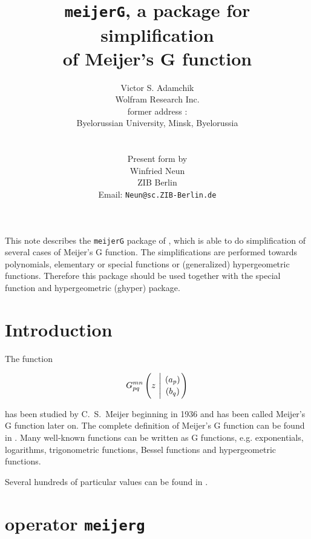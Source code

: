 \title{{\tt meijerG}, a package for simplification\\
of Meijer's G function}
\date{}
\author{Victor S. Adamchik\\
	Wolfram Research Inc. \\
	former address : \\
	Byelorussian University, Minsk, Byelorussia\\
\\
\\
	Present \REDUCE{} form by \\
	Winfried Neun \\
	ZIB Berlin \\
        Email: {\tt Neun@sc.ZIB-Berlin.de}}

\maketitle

This note describes the {\tt meijerG} package of \REDUCE{}, which is able
to do simplification of several cases of Meijer's G function. 
The simplifications are performed towards polynomials, elementary or
special functions or (generalized) hypergeometric functions.
Therefore this package should be used together with the \REDUCE{}
special function and hypergeometric (ghyper) package.

\section{Introduction}

The function 

\begin{displaymath}
G_{p q}^{m n} \left( z \  \Bigg\vert \  {(a_p) \atop (b_q)} \right)
\end{displaymath}

has been studied by C.~S.~Meijer beginning in 1936 and has been
called Meijer's G function later on. The complete definition of Meijer's
G function can be found in \cite{Prudnikov:90}.
Many well-known functions can be written as G functions,
e.g. exponentials, logarithms, trigonometric functions, Bessel functions
and hypergeometric functions.

Several hundreds of particular values can be found in \cite{Prudnikov:90}.

\section{\REDUCE{} operator {\tt meijerg}}

